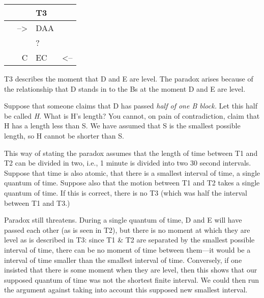 \documentclass[oneside]{article}
\begin{document}
\begin{longtable}[c]{@{}rll@{}}
\toprule
& T3 &\tabularnewline
\midrule
\endhead
--\textgreater{} & DAA &\tabularnewline
& ? &\tabularnewline
~ ~ C & EC~ & \textless{}--\tabularnewline
\bottomrule
\end{longtable}

T3 describes the moment that D and E are level. The paradox arises because of the relationship that D stands in to the Bs at the moment D and E are level.

Suppose that someone claims that D has passed \emph{half
of one B block.} Let this half be called \emph{H}. What is H's length?
You cannot, on pain of contradiction, claim that H has a length less
than S. We have assumed that S is the smallest possible length, so H
cannot be shorter than S. 

This way of stating the paradox assumes that the length of time between
T1 and T2 can be divided in two, i.e., 1 minute is divided into two 30
second intervals. Suppose that time is also atomic, that there is a
smallest interval of time, a single quantum of time. Suppose also that
the motion between T1 and T2 takes a single quantum of time. If this is
correct, there is no T3 (which was half the interval between T1 and T3.)

Paradox still threatens. During a single quantum of time, D and E will
have passed each other (as is seen in T2), but there is no moment at
which they are level as is described in T3: since T1 \& T2 are
separated by the smallest possible interval of time, there can be no moment of time between them---it would be a interval of time smaller than the smallest interval of time. Conversely, if one insisted that there is some moment when they are level, then this shows that our supposed quantum of time was not the shortest finite interval. We could then run the argument against taking into account this supposed new smallest interval.
\end{document}
